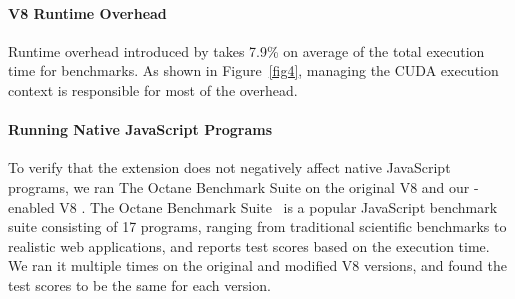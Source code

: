 \paragraph{V8 Runtime Overhead} Runtime overhead introduced by \name
takes 7.9\% on average of the total execution time for \name
benchmarks. As shown in Figure~\ref{fig4}, managing the CUDA execution context is
responsible for most of the overhead.

\paragraph{Running Native JavaScript Programs} To verify that the \name
extension does not negatively affect native JavaScript programs, we ran The Octane
Benchmark Suite on the original V8 and our \namens-enabled V8 . The Octane
Benchmark Suite~\cite{octane} is a popular JavaScript benchmark suite
consisting of 17 programs, ranging from traditional scientific benchmarks to
realistic web applications, and reports test scores based on the execution
time. We ran it multiple times on the original and modified V8 versions, and
found the test scores to be the same for each version. 



